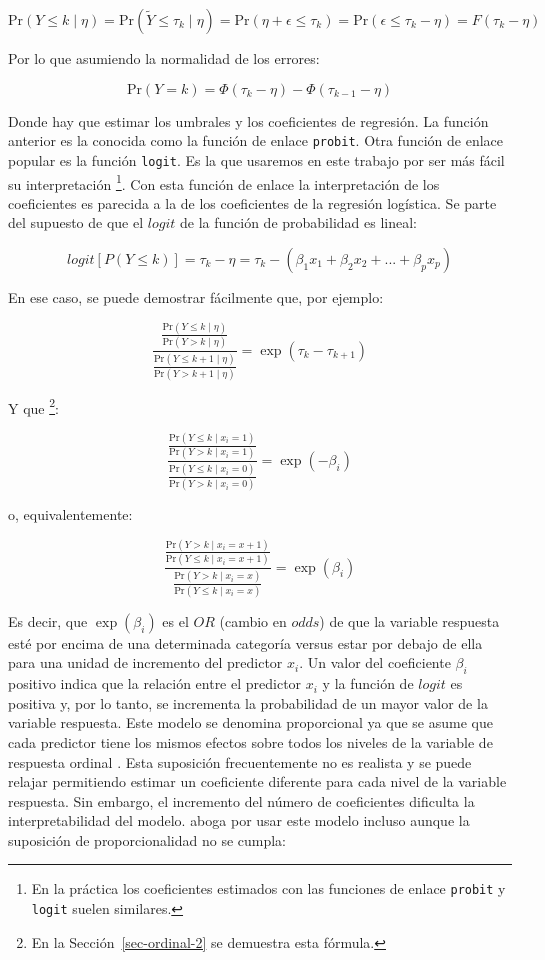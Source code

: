 \documentclass[
  12pt,
  a4paper,
  extrafontsizes,
  onecolumn,
  openright]{memoir}
\begin{document}
\[\mathrm{Pr}(Y \leq k \mid \eta) = \mathrm{Pr}(\tilde{Y} \leq \tau_k \mid \eta) = \mathrm{Pr}(\eta + \epsilon \leq \tau_k) = \mathrm{Pr}(\epsilon \leq \tau_k - \eta) = F(\tau_k - \eta)\]

Por lo que asumiendo la normalidad de los errores:

\[\mathrm{Pr}(Y = k) = \Phi(\tau_k - \eta) - \Phi(\tau_{k - 1} - \eta)\]

Donde hay que estimar los umbrales y los coeficientes de regresión. La
función anterior es la conocida como la función de enlace
\texttt{probit}. Otra función de enlace popular es la función
\texttt{logit}. Es la que usaremos en este trabajo por ser más fácil su
interpretación \footnote{En la práctica los coeficientes estimados con
  las funciones de enlace \texttt{probit} y \texttt{logit} suelen
  similares.}. Con esta función de enlace la interpretación de los
coeficientes es parecida a la de los coeficientes de la regresión
logística. Se parte del supuesto de que el \(logit\) de la función de
probabilidad es lineal:

\[logit [P(Y \le k)] = \tau_{k} - \eta = \tau_{k} - (\beta_1 x_1 + \beta_2 x_2 + ... + \beta_p x_p)\]

En ese caso, se puede demostrar fácilmente que, por ejemplo:

\[\frac{\frac{\mathrm{Pr}(Y \leq k \mid \eta)}{\mathrm{Pr}(Y > k \mid \eta)}}{\frac{\mathrm{Pr}(Y \leq k+1 \mid \eta)}{\mathrm{Pr}(Y > k+1 \mid \eta)}} = \exp(\tau_{k} - \tau_{k+1})\]

Y que \footnote{En la Sección~\ref{sec-ordinal-2} se demuestra esta
  fórmula.}:

\[\frac{\frac{\mathrm{Pr}(Y \leq k \mid x_i = 1)}{\mathrm{Pr}(Y > k \mid x_i = 1)}}{\frac{\mathrm{Pr}(Y \leq k \mid x_i=0)}{\mathrm{Pr}(Y > k \mid x_i = 0)}} = \exp(-\beta_{i})\]

o, equivalentemente:

\[\frac{\frac{\mathrm{Pr}(Y > k \mid x_i = x + 1)}{\mathrm{Pr}(Y \leq k \mid x_i = x + 1)}}{\frac{\mathrm{Pr}(Y > k \mid x_i = x)}{\mathrm{Pr}(Y \leq k \mid x_i = x)}} = \exp(\beta_{i})\]

Es decir, que \(\exp(\beta_{i})\) es el \(OR\) (cambio en \(odds\)) de
que la variable respuesta esté por encima de una determinada categoría
versus estar por debajo de ella para una unidad de incremento del
predictor \(x_i\). Un valor del coeficiente \(\beta_i\) positivo indica
que la relación entre el predictor \(x_i\) y la función de \(logit\) es
positiva y, por lo tanto, se incrementa la probabilidad de un mayor
valor de la variable respuesta. Este modelo se denomina proporcional ya
que se asume que cada predictor tiene los mismos efectos sobre todos los
niveles de la variable de respuesta ordinal \autocite[ver][]{Liu2202}.
Esta suposición frecuentemente no es realista y se puede relajar
permitiendo estimar un coeficiente diferente para cada nivel de la
variable respuesta. Sin embargo, el incremento del número de
coeficientes dificulta la interpretabilidad del modelo.
\textcite{harrell2020} aboga por usar este modelo incluso aunque la
suposición de proporcionalidad no se cumpla:
\end{document}
